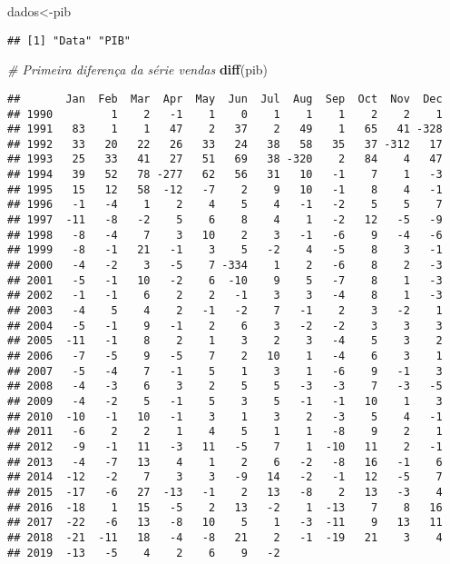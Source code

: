 \documentclass[]{article}
\newenvironment{Shaded}{\begin{snugshade}}{\end{snugshade}}
\newcommand{\CommentTok}[1]{\textcolor[rgb]{0.56,0.35,0.01}{\textit{#1}}}
\newcommand{\KeywordTok}[1]{\textcolor[rgb]{0.13,0.29,0.53}{\textbf{#1}}}
\newcommand{\NormalTok}[1]{#1}
\begin{document}
\begin{Shaded}
\begin{Highlighting}[]
\NormalTok{dados<-pib}
\end{Highlighting}
\end{Shaded}

\begin{verbatim}
## [1] "Data" "PIB"
\end{verbatim}

\begin{Shaded}
\begin{Highlighting}[]
\CommentTok{# Primeira diferença da série vendas}
\KeywordTok{diff}\NormalTok{(pib)}
\end{Highlighting}
\end{Shaded}

\begin{verbatim}
##       Jan  Feb  Mar  Apr  May  Jun  Jul  Aug  Sep  Oct  Nov  Dec
## 1990         1    2   -1    1    0    1    1    1    2    2    1
## 1991   83    1    1   47    2   37    2   49    1   65   41 -328
## 1992   33   20   22   26   33   24   38   58   35   37 -312   17
## 1993   25   33   41   27   51   69   38 -320    2   84    4   47
## 1994   39   52   78 -277   62   56   31   10   -1    7    1   -3
## 1995   15   12   58  -12   -7    2    9   10   -1    8    4   -1
## 1996   -1   -4    1    2    4    5    4   -1   -2    5    5    7
## 1997  -11   -8   -2    5    6    8    4    1   -2   12   -5   -9
## 1998   -8   -4    7    3   10    2    3   -1   -6    9   -4   -6
## 1999   -8   -1   21   -1    3    5   -2    4   -5    8    3   -1
## 2000   -4   -2    3   -5    7 -334    1    2   -6    8    2   -3
## 2001   -5   -1   10   -2    6  -10    9    5   -7    8    1   -3
## 2002   -1   -1    6    2    2   -1    3    3   -4    8    1   -3
## 2003   -4    5    4    2   -1   -2    7   -1    2    3   -2    1
## 2004   -5   -1    9   -1    2    6    3   -2   -2    3    3    3
## 2005  -11   -1    8    2    1    3    2    3   -4    5    3    2
## 2006   -7   -5    9   -5    7    2   10    1   -4    6    3    1
## 2007   -5   -4    7   -1    5    1    3    1   -6    9   -1    3
## 2008   -4   -3    6    3    2    5    5   -3   -3    7   -3   -5
## 2009   -4   -2    5   -1    5    3    5   -1   -1   10    1    3
## 2010  -10   -1   10   -1    3    1    3    2   -3    5    4   -1
## 2011   -6    2    2    1    4    5    1    1   -8    9    2    1
## 2012   -9   -1   11   -3   11   -5    7    1  -10   11    2   -1
## 2013   -4   -7   13    4    1    2    6   -2   -8   16   -1    6
## 2014  -12   -2    7    3    3   -9   14   -2   -1   12   -5    7
## 2015  -17   -6   27  -13   -1    2   13   -8    2   13   -3    4
## 2016  -18    1   15   -5    2   13   -2    1  -13    7    8   16
## 2017  -22   -6   13   -8   10    5    1   -3  -11    9   13   11
## 2018  -21  -11   18   -4   -8   21    2   -1  -19   21    3    4
## 2019  -13   -5    4    2    6    9   -2
\end{verbatim}
\end{document}
